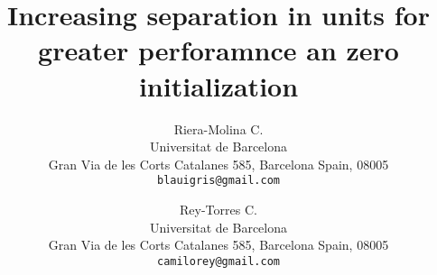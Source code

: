\documentclass[10pt,twocolumn,letterpaper]{article}
\begin{document}
\title{Increasing separation in units for greater perforamnce an zero initialization}

\author{Riera-Molina C.\\
Universitat de Barcelona\\
Gran Via de les Corts Catalanes 585, Barcelona Spain, 08005\\
{\tt\small blauigris@gmail.com}
\and
Rey-Torres C.\\
Universitat de Barcelona\\
Gran Via de les Corts Catalanes 585, Barcelona Spain, 08005\\
{\tt\small camilorey@gmail.com}
}

\maketitle







{\small


}
\end{document}
